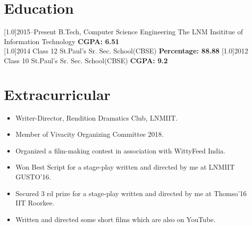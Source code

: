 \documentclass[english]{cv-style}     %
\begin{document}
\section{Education}
  \vspace{-0.2cm}
\begin{entrylist}
\entry
{\scalebox{.8}[1.0]{2015--Present}}
{B.Tech, Computer Science Engineering}
{The LNM Insititue of Information Technology}
{\textbf{CGPA: 6.51}\\
\small{}}
\entry
{\scalebox{.8}[1.0]{2014}}
{Class 12}
{St.Paul's Sr. Sec. School(CBSE)}
{\textbf{Percentage: 88.88}}
\entry
{\scalebox{.8}[1.0]{2012}}
{Class 10}
{St.Paul's Sr. Sec. School(CBSE)}
{\textbf{CGPA: 9.2}}
\end{entrylist}
\section{Extracurricular}
  \vspace{-0.2cm}
\begin{itemize}
\item  Writer-Director, Rendition Dramatics Club, LNMIIT.
\item Member of Vivacity Organizing Committee 2018.
\item Organized a film-making contest in association with WittyFeed India.
\item Won Best Script for a stage-play written and directed by me at LNMIIT GUSTO’16.
\item Secured 3 rd prize for a stage-play written and directed by me at Thomso’16 IIT Roorkee.
\item Written and directed some short films which are also on YouTube.
\end{itemize}

  \vspace{-0.2cm}
\end{document}
